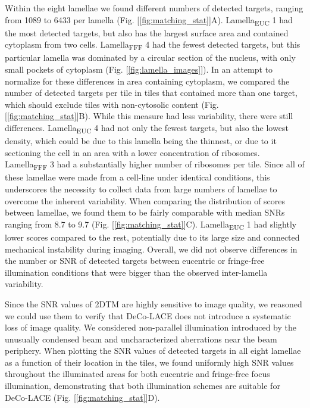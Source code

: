 \documentclass[
]{article}
\begin{document}
Within the eight lamellae we found different numbers of detected targets, ranging from 1089 to 6433 per lamella (Fig.
{[}\ref{fig:matching_stat}{]}A). Lamella\textsubscript{EUC} 1 had the most detected targets, but also has
the largest surface area and contained cytoplasm from two cells. Lamella\textsubscript{FFF} 4
had the fewest detected targets, but this particular lamella was dominated by a
circular section of the nucleus, with only small pockets of cytoplasm (Fig.
{[}\ref{fig:lamella_images}{]}). In an attempt to normalize for these differences in
area containing cytoplasm, we compared the number of detected targets per tile in
tiles that contained more than one target, which should exclude tiles with
non-cytosolic content (Fig. {[}\ref{fig:matching_stat}{]}B). While this measure had
less variability, there were still differences. Lamella\textsubscript{EUC} 4 had not only the
fewest targets, but also the lowest density, which could be due to this lamella being the
thinnest, or due to it sectioning the cell in an area with a lower concentration of
ribosomes. Lamella\textsubscript{FFF} 3 had a substantially higher number of ribosomes per
tile. Since all of these lamellae were made from a cell-line under identical
conditions, this underscores the necessity to collect data from large numbers of
lamellae to overcome the inherent variability. When comparing the distribution of
scores between lamellae, we found them to be fairly comparable with median
SNRs ranging from 8.7 to 9.7 (Fig. {[}\ref{fig:matching_stat}{]}C). Lamella\textsubscript{EUC} 1 had slightly lower scores compared
to
the rest, potentially due to its large size and connected mechanical instability
during imaging. Overall, we did not observe differences in the number or SNR of
detected targets between eucentric or fringe-free illumination conditions that
were bigger than the observed inter-lamella variability.

Since the SNR values of 2DTM are highly sensitive to image quality, we reasoned
we could use them to verify that DeCo-LACE does not introduce a systematic loss
of image quality. We considered non-parallel illumination introduced by the
unusually condensed beam and uncharacterized aberrations near the beam
periphery. When plotting the SNR values of detected targets in all eight
lamellae as a function of their location in the tiles, we found uniformly high
SNR values throughout the illuminated areas for both eucentric and fringe-free
focus illumination, demonstrating that both illumination schemes are suitable
for DeCo-LACE (Fig. {[}\ref{fig:matching_stat}{]}D).
\end{document}

